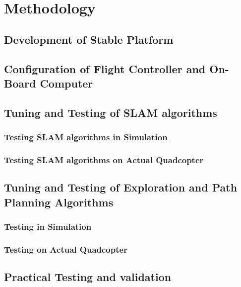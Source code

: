 \graphicspath{{introduction/fig/}}

\chapter{Methodology}
\label{chap:Methodology}

\section{Development of Stable Platform}

\section{Configuration of Flight Controller and On-Board Computer}

\section{Tuning and Testing of SLAM algorithms}

\subsection{Testing SLAM algorithms in Simulation}

\subsection{Testing SLAM algorithms on Actual Quadcopter}

\section{Tuning and Testing of Exploration and Path Planning Algorithms}

\subsection{Testing in Simulation}

\subsection{Testing on Actual Quadcopter}

\section{Practical Testing and validation}